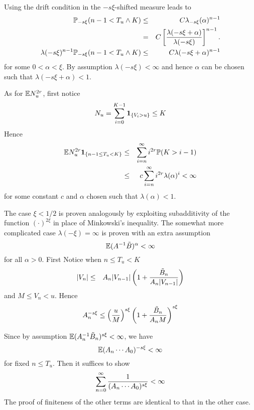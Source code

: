\documentclass{beamer}
\begin{document}
\begin{frame}
  Using the drift condition in the $-s\xi$-shifted measure leads to
  \begin{eqnarray*}
    \P_{-s\xi}(n-1 < T_u \wedge K) &\leq& C
    \lambda_{-s\xi}(\alpha)^{n-1} \\
    &=& C \left[
      {
      \lambda(-s\xi + \alpha)
      \over
      \lambda(-s\xi)
    }
    \right]^{n-1}. \\
    \lambda(-s\xi)^{n-1} \P_{-s\xi}(n-1 < T_u \wedge K) &\leq& C
    \lambda(-s\xi + \alpha)^{n-1}
  \end{eqnarray*}
  for some $0 < \alpha < \xi$. By assumption $\lambda(-s\xi) < \infty$
  and hence $\alpha$ can be chosen such that $\lambda(-s\xi + \alpha)
  < 1$.
\end{frame}

\begin{frame}
  As for $\E N_u^{2r}$, first notice
  \[
  N_u = \sum_{i=0}^{K-1} \1{V_i > u} \leq K
  \]
  Hence
  \begin{eqnarray*}
    \E N_u^{2r}\1{n-1 \leq T_u < K} &\leq& \sum_{i=n}^\infty i^{2r}
    \P(K > i-1) \\
    &\leq& c \sum_{i=n}^\infty i^{2r} \lambda(\alpha)^i < \infty
  \end{eqnarray*}
  for some constant $c$ and $\alpha$ chosen such that $\lambda(\alpha)
  < 1$.
\end{frame}

\begin{frame}
  The case $\xi < 1/2$ is proven analogously by exploiting
  subadditivity of the function $(\cdot)^{2\xi}$ in place of
  Minkowski's inequality. The somewhat more complicated case
  $\lambda(-\xi) = \infty$ is proven with an extra assumption
  \[
  \E (A^{-1} \tilde B)^\alpha < \infty
  \]
  for all $\alpha > 0$. First Notice when $n \leq T_u < K$
  \begin{eqnarray*}
    |V_n| &\leq& A_n |V_{n-1}| \left(
      1 + {
        \tilde B_n
        \over
        A_n |V_{n-1}|
      }
    \right)
  \end{eqnarray*}
  and $M \leq V_n < u$. Hence
  \[
  A_n^{-s\xi} \leq \left(
    {
      u \over M
    }
    \right)^{s\xi} 
    \left(
    1 + {
      \tilde B_n
      \over
      A_n M
    }
  \right)^{s\xi}
  \]
\end{frame}

\begin{frame}
  Since by assumption $\E (A_n^{-1} \tilde B_n)^{s\xi} < \infty$, we
  have
  \[
  \E (A_{n} \cdots A_0)^{-s\xi} < \infty
  \]
  for fixed $n \leq T_u$. Then it suffices to show
  \[
  \sum_{n=0}^\infty {
    1 \over
    (A_n \cdots A_0)^{s\xi}
  } < \infty
  \]
  The proof of finiteness of the other terms are identical to that in
  the other case.
\end{frame}
\end{document}
